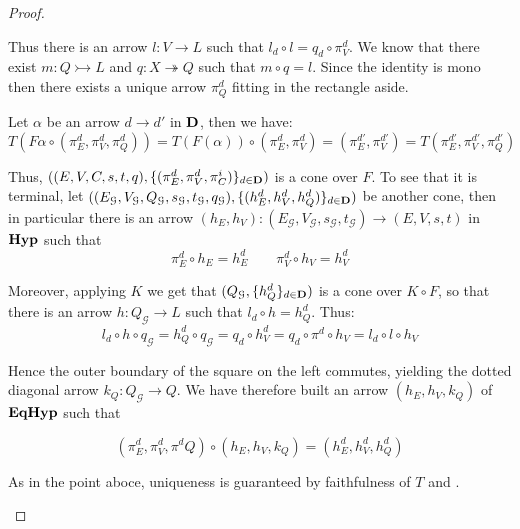 \documentclass[a4paper,UKenglish,cleveref,pdftex,thm-restate,numberwithinsect]{lipics-v2021}
\def\D{\textbf {\textup{D}}}
\newcommand{\catname}[1]{\textbf{\textup{#1}}}
\newcommand{\hyp}{\catname{Hyp}}
\newcommand{\EqHyp}{\catname{EqHyp}} %
\newcommand{\mto}{\rightarrowtail}
\newcommand{\eto}{\twoheadrightarrow}
\newcommand{\id}[1]{\mathsf{id}_{#1}}
\begin{document}
\begin{proof}
\begin{enumerate}
\noindent 
\parbox{9.5cm}{Thus there is an arrow $l\colon V\to L$ such that $l_d\circ l=q_d\circ \pi^d_V$. We know that there exist $m\colon Q\mto L$ and $q\colon X\eto Q $ such that $m\circ q=l$. Since the identity is mono then there exists a unique arrow $\pi^d_Q$ fitting in the rectangle aside.} 	\hfill \parbox{3cm}{\xymatrix{
	V\ar[r]^{\pi_V^d}\ar@{>>}[d]_{q}&V_d\ar@{>>}[r]^{q_d}&Q_d\ar[d]^{\id{Q_d}}\\Q\ar@{>->}[r]_{m}\ar@{.>}[urr]_{\pi_Q^d}&L\ar[r]_{l_d}&{Q_d}
	}}
	
	Let $\alpha$ be an arrow $d\to d'$ in $\D$, then we have:
		\[T(F\alpha\circ (\pi^d_{E}, \pi^d_V, \pi^d_Q))=T(F(\alpha))\circ (\pi^d_E, \pi^d_V)=(\pi^{d'}_E, \pi^{d'}_V)=T(\pi^{d'}_{E}, \pi^{d'}_V, \pi^{d'}_Q)\]
	
	
	
	
		Thus, $((E, V, C, s, t, q), \{(\pi_E^d, \pi_V^d, \pi_C^i)\}_{d\in \D})$ is a cone over $F$. To see that it is terminal, let $((E_\mathcal{G},V_\mathcal{G}, Q_{\mathcal{G}}, s_{\mathcal{G}}, t_{\mathcal{G}}, q_{\mathcal{G}}), \{(h^d_E, h^d_V, h^d_Q)\}_{d\in \D})$ be another cone, then in particular there is an arrow $(h_E, h_V)\colon (E_\mathcal{G},V_\mathcal{G},  s_{\mathcal{G}}, t_{\mathcal{G}})\to (E, V, s, t)$ in $\hyp$ such that
		\[\pi^d_E\circ h_E=h^d_E \qquad \pi^d_V\circ h_V=h^d_V\]

		Moreover, applying $K$ we get that $(Q_{\mathcal{G}}, \{h^d_{Q}\}_{d\in \D})$ is a cone over $K\circ F$, so that there is an arrow $h\colon Q_{\mathcal{G}} \to L$ such that $l_d\circ h=h^d_{Q}$.  Thus:
		\[l_d\circ h\circ q_\mathcal{G}=h^d_Q\circ q_{\mathcal{G}}=q_{d}\circ h^d_V=q_d\circ \pi^d\circ h_V=l_d\circ l\circ h_V\]

\noindent 
\parbox{2cm}{}\hfill \parbox{9.5cm}{Hence the  outer boundary of the square on the left commutes, yielding the dotted diagonal arrow $k_Q\colon Q_\mathcal{G}\to Q$.  We have therefore built an arrow $(h_E, h_V, k_Q)$ of $\EqHyp$ such that}
\[(\pi^d_E, \pi^d_V, \pi^dQ)\circ (h_E, h_V, k_Q)=(h^d_E, h^d_V, h^d_Q)\] 

As in the point aboce, uniqueness is guaranteed by faithfulness of $T$ and .	\qedhere 
	\end{enumerate}
\end{proof}
\end{document}
